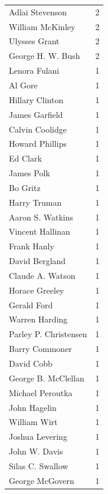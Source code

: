 \documentclass[
  letterpaper,
  DIV=11,
  numbers=noendperiod]{scrreprt}
\begin{document}
\begin{tabular}{lr}
Adlai Stevenson        &          2 \\
William McKinley       &          2 \\
Ulysses Grant          &          2 \\
George H. W. Bush      &          2 \\
Lenora Fulani          &          1 \\
Al Gore                &          1 \\
Hillary Clinton        &          1 \\
James Garfield         &          1 \\
Calvin Coolidge        &          1 \\
Howard Phillips        &          1 \\
Ed Clark               &          1 \\
James Polk             &          1 \\
Bo Gritz               &          1 \\
Harry Truman           &          1 \\
Aaron S. Watkins       &          1 \\
Vincent Hallinan       &          1 \\
Frank Hanly            &          1 \\
David Bergland         &          1 \\
Claude A. Watson       &          1 \\
Horace Greeley         &          1 \\
Gerald Ford            &          1 \\
Warren Harding         &          1 \\
Parley P. Christensen  &          1 \\
Barry Commoner         &          1 \\
David Cobb             &          1 \\
George B. McClellan    &          1 \\
Michael Peroutka       &          1 \\
John Hagelin           &          1 \\
William Wirt           &          1 \\
Joshua Levering        &          1 \\
John W. Davis          &          1 \\
Silas C. Swallow       &          1 \\
George McGovern        &          1 \\

\end{tabular}
\end{document}
